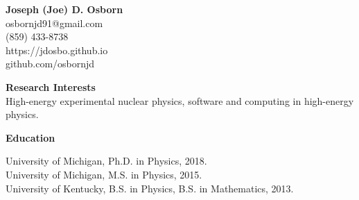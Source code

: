\documentclass[11pt]{article}
\begin{document}

\begin{center}
\Large\textbf{Joseph (Joe) D. Osborn} \\
\normalsize
osbornjd91@gmail.com \\
(859) 433-8738 \\
https://jdosbo.github.io \\
github.com/osbornjd
\end{center}



\begin{flushleft}
\LARGE\textbf{Research Interests} \\
\normalsize High-energy experimental nuclear physics, software and computing in high-energy physics.  \\ 
\end{flushleft}











\vspace{3pt}
\begin{flushleft}
\LARGE\textbf{Education} \\
\normalsize 

University of Michigan, Ph.D. in Physics, 2018. \\
University of Michigan, M.S. in Physics, 2015. \\
University of Kentucky, B.S. in Physics, B.S. in Mathematics, 2013.\\


\end{flushleft}
\end{document}
